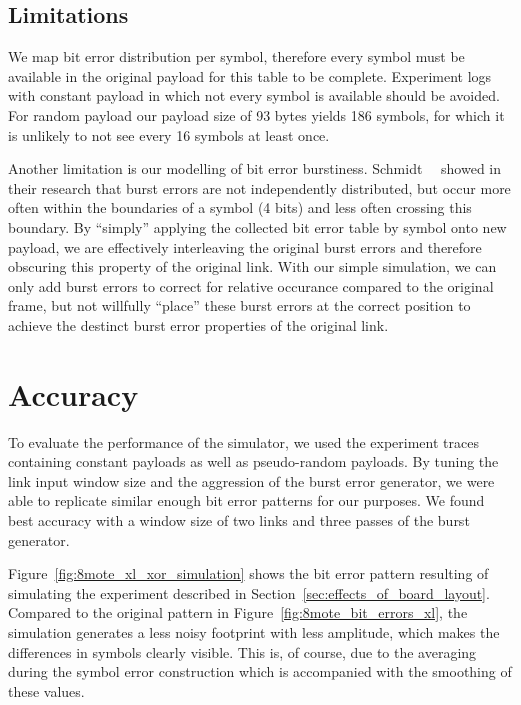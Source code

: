 \subsection{Limitations}

We map bit error distribution per symbol, therefore every symbol must be available in the original payload for this table to be complete.
Experiment logs with constant payload in which not every symbol is available should be avoided.
For random payload our payload size of 93 bytes yields 186 symbols, for which it is unlikely to not see every 16 symbols at least once.

Another limitation is our modelling of bit error burstiness.
Schmidt~\etal~\cite{Schmidt2013} showed in their research that burst errors are not independently distributed, but occur more often within the boundaries of a symbol (4 bits) and less often crossing this boundary.
By ``simply'' applying the collected bit error table by symbol onto new payload, we are effectively interleaving the original burst errors and therefore obscuring this property of the original link.
With our simple simulation, we can only add burst errors to correct for relative occurance compared to the original frame, but not willfully ``place'' these burst errors at the correct position to achieve the destinct burst error properties of the original link.


\section{Accuracy}

To evaluate the performance of the simulator, we used the experiment traces containing constant payloads as well as pseudo-random payloads.
By tuning the link input window size and the aggression of the burst error generator, we were able to replicate similar enough bit error patterns for our purposes.
We found best accuracy with a window size of two links and three passes of the burst generator.

Figure~\ref{fig:8mote_xl_xor_simulation} shows the bit error pattern resulting of simulating the experiment described in Section~\ref{sec:effects_of_board_layout}.
Compared to the original pattern in Figure~\ref{fig:8mote_bit_errors_xl}, the simulation generates a less noisy footprint with less amplitude, which makes the differences in symbols clearly visible.
This is, of course, due to the averaging during the symbol error construction which is accompanied with the smoothing of these values.

